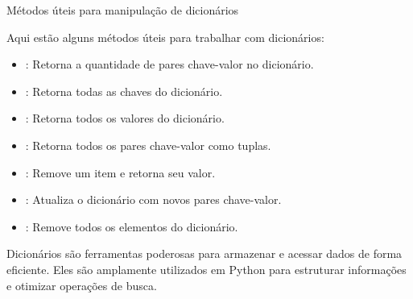 Métodos úteis para manipulação de dicionários


Aqui estão alguns métodos úteis para trabalhar com dicionários:
\begin{itemize}
\item {}: Retorna a quantidade de pares chave-valor no dicionário.
\item {}: Retorna todas as chaves do dicionário.
\item {}: Retorna todos os valores do dicionário.
\item {}: Retorna todos os pares chave-valor como tuplas.
\item {}: Remove um item e retorna seu valor.
\item {}: Atualiza o dicionário com novos pares chave-valor.
\item {}: Remove todos os elementos do dicionário.
\end{itemize}

Dicionários são ferramentas poderosas para armazenar e acessar dados de forma eficiente.
Eles são amplamente utilizados em Python para estruturar informações e otimizar operações de busca.


